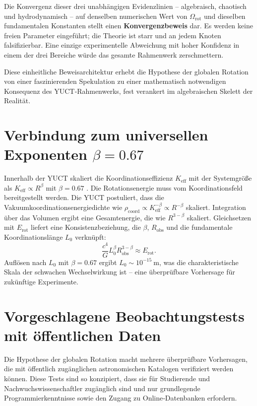 \documentclass[11pt,a4paper]{article}
\newcommand{\Keff}{K_{\mathrm{eff}}}
\begin{document}
	Die Konvergenz dieser drei unabhängigen Evidenzlinien – algebraisch, chaotisch und hydrodynamisch – auf denselben numerischen Wert von \(\Omega_{\mathrm{rot}}\) und dieselben fundamentalen Konstanten stellt einen \textbf{Konvergenzbeweis} dar. Es werden keine freien Parameter eingeführt; die Theorie ist starr und an jedem Knoten falsifizierbar. Eine einzige experimentelle Abweichung mit hoher Konfidenz in einem der drei Bereiche würde das gesamte Rahmenwerk zerschmettern.
	
	Diese einheitliche Beweisarchitektur erhebt die Hypothese der globalen Rotation von einer faszinierenden Spekulation zu einer mathematisch notwendigen Konsequenz des YUCT‑Rahmenwerks, fest verankert im algebraischen Skelett der Realität.
	
	\section{Verbindung zum universellen Exponenten \(\beta = 0.67\)}
	
	Innerhalb der YUCT skaliert die Koordinationseffizienz \(\Keff\) mit der Systemgröße als \(\Keff \propto R^{\beta}\) mit \(\beta = 0.67\) \cite{AppendixL}. Die Rotationsenergie muss vom Koordinationsfeld bereitgestellt werden. Die YUCT postuliert, dass die Vakuumkoordinationsenergiedichte wie \(\rho_{\text{coord}} \propto \Keff^{-\beta} \propto R^{-\beta}\) skaliert. Integration über das Volumen ergibt eine Gesamtenergie, die wie \(R^{3-\beta}\) skaliert. Gleichsetzen mit \(E_{\text{rot}}\) liefert eine Konsistenzbeziehung, die \(\beta\), \(R_{\text{obs}}\) und die fundamentale Koordinationslänge \(L_0\) verknüpft:
	\begin{equation}
		\frac{c^4}{G} L_0^{\beta} R_{\text{obs}}^{3-\beta} \approx E_{\text{rot}}.
	\end{equation}
	Auflösen nach \(L_0\) mit \(\beta = 0.67\) ergibt \(L_0 \sim 10^{-15}\ \text{m}\), was die charakteristische Skala der schwachen Wechselwirkung ist – eine überprüfbare Vorhersage für zukünftige Experimente.
	
	\section{Vorgeschlagene Beobachtungstests mit öffentlichen Daten}
	
	Die Hypothese der globalen Rotation macht mehrere überprüfbare Vorhersagen, die mit öffentlich zugänglichen astronomischen Katalogen verifiziert werden können. Diese Tests sind so konzipiert, dass sie für Studierende und Nachwuchswissenschaftler zugänglich sind und nur grundlegende Programmierkenntnisse sowie den Zugang zu Online‑Datenbanken erfordern.
	
\end{document}
